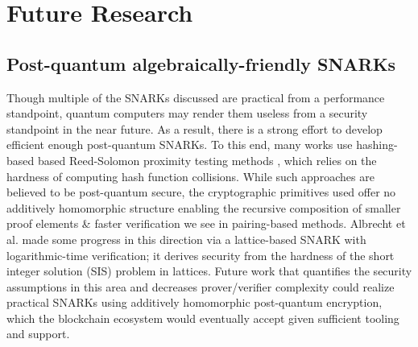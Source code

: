 \section{Future Research}

\subsection{Post-quantum algebraically-friendly SNARKs}
\noindent Though multiple of the SNARKs discussed are practical from a performance standpoint, quantum computers may render them useless from a security standpoint in the near future. As a result, there is a strong effort to develop efficient enough post-quantum SNARKs. To this end, many works \cite{starks, ligero, fractal, spartan, jolt} use hashing-based based Reed-Solomon proximity testing methods \cite{fri}, which relies on the hardness of computing hash function collisions. While such approaches are believed to be post-quantum secure, the cryptographic primitives used offer no additively homomorphic structure enabling the recursive composition of smaller proof elements \& faster verification we see in pairing-based methods. Albrecht et al. \cite{lattice1} made some progress in this direction via a lattice-based SNARK with logarithmic-time verification; it derives security from the hardness of the short integer solution (SIS) problem in lattices. Future work that quantifies the security assumptions in this area and decreases prover/verifier complexity could realize practical SNARKs using additively homomorphic post-quantum encryption, which the blockchain ecosystem would eventually accept given sufficient tooling and support.

